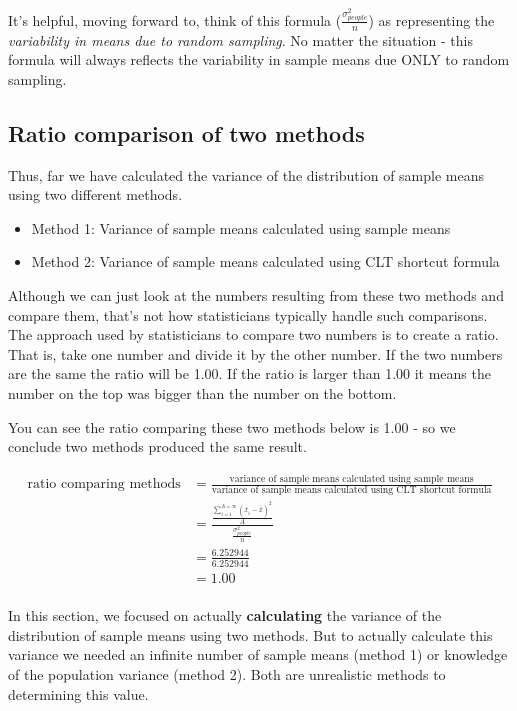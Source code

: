 \documentclass[
]{krantz}
\begin{document}
It's helpful, moving forward to, think of this formula (\(\frac{\sigma_{people}^2}{n}\)) as representing the \emph{variability in means due to random sampling}. No matter the situation - this formula will always reflects the variability in sample means due ONLY to random sampling.

\hypertarget{ratio-comparison-of-two-methods}{%
\subsection{Ratio comparison of two methods}\label{ratio-comparison-of-two-methods}}

Thus, far we have calculated the variance of the distribution of sample means using two different methods.

\begin{itemize}
\item
  Method 1: Variance of sample means calculated using sample means
\item
  Method 2: Variance of sample means calculated using CLT shortcut formula
\end{itemize}

Although we can just look at the numbers resulting from these two methods and compare them, that's not how statisticians typically handle such comparisons. The approach used by statisticians to compare two numbers is to create a ratio. That is, take one number and divide it by the other number. If the two numbers are the same the ratio will be 1.00. If the ratio is larger than 1.00 it means the number on the top was bigger than the number on the bottom.

You can see the ratio comparing these two methods below is 1.00 - so we conclude two methods produced the same result.

\[
\begin{aligned} 
\text{ratio comparing methods} &= \frac{\text{variance of sample means calculated using sample means}}{\text{variance of sample means calculated using CLT shortcut formula}}\\
&=\frac{\frac{\sum_{i=1}^{A=\infty}{(\bar{x}_i - \bar{\bar{x}})^2}}{A}}{\frac{\sigma_{people}^2}{n}}\\
&=\frac{6.252944}{6.252944}\\
&= 1.00\\
\end{aligned} 
\]

In this section, we focused on actually \textbf{calculating} the variance of the distribution of sample means using two methods. But to actually calculate this variance we needed an infinite number of sample means (method 1) or knowledge of the population variance (method 2). Both are unrealistic methods to determining this value.
\end{document}
